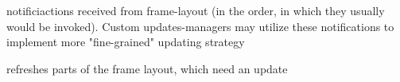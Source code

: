 

\label{cbupdatesmanagerbaseonstartchanges}


notificiactions received from frame-layout (in the order, in which
they usually would be invoked). Custom updates-managers may utilize
these notifications to implement more "fine-grained" updating strategy


\label{cbupdatesmanagerbasesetlayout}



\label{cbupdatesmanagerbaseupdatenow}


refreshes parts of the frame layout, which need an update

